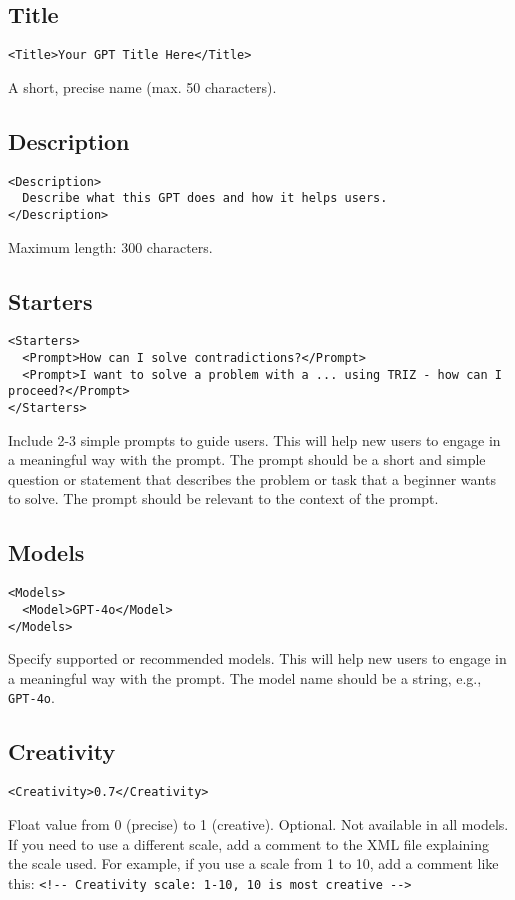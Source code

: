 \documentclass[a4paper,11pt]{refart}
\begin{document}
\subsection{Title}
\begin{lstlisting}
<Title>Your GPT Title Here</Title>
\end{lstlisting}
A short, precise name (max. 50 characters).

\subsection{Description}
\begin{lstlisting}
<Description>
  Describe what this GPT does and how it helps users.
</Description>
\end{lstlisting}
Maximum length: 300 characters.

\subsection{Starters}
\begin{lstlisting}
<Starters>
  <Prompt>How can I solve contradictions?</Prompt>
  <Prompt>I want to solve a problem with a ... using TRIZ - how can I proceed?</Prompt>
</Starters>
\end{lstlisting}
Include 2-3 simple prompts to guide users. This will help new users to engage in a meaningful way with the prompt. The prompt should be a short and simple question or statement that describes the problem or task that a beginner wants to solve. The prompt should be relevant to the context of the prompt.

\subsection{Models}
\begin{lstlisting}
<Models>
  <Model>GPT-4o</Model>
</Models>
\end{lstlisting}
Specify supported or recommended models. This will help new users to engage in a meaningful way with the prompt. The model name should be a string, e.g., \texttt{GPT-4o}.

\subsection{Creativity}
\begin{lstlisting}
<Creativity>0.7</Creativity>
\end{lstlisting}
Float value from 0 (precise) to 1 (creative). Optional. Not available in all models. If you need to use a different scale, add a comment to the XML file explaining the scale used. For example, if you use a scale from 1 to 10, add a comment like this: \lstinline|<!-- Creativity scale: 1-10, 10 is most creative -->|
\end{document}
